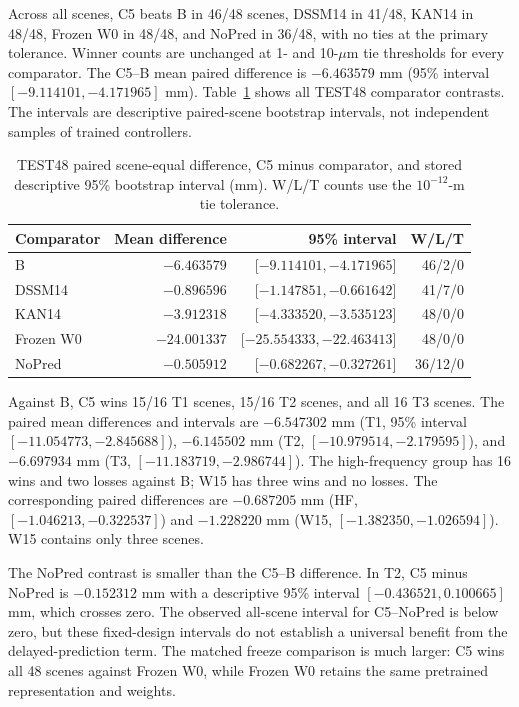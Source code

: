 \documentclass[11pt]{article}
\begin{document}
Across all scenes, C5 beats B in 46/48 scenes, DSSM14 in 41/48, KAN14 in 48/48, Frozen W0 in 48/48, and NoPred in 36/48, with no ties at the primary tolerance. Winner counts are unchanged at 1- and 10-$\mu$m tie thresholds for every comparator. The C5--B mean paired difference is $-6.463579$ mm (95\% interval $[-9.114101,-4.171965]$ mm). Table~\ref{tab:contrasts} shows all TEST48 comparator contrasts. The intervals are descriptive paired-scene bootstrap intervals, not independent samples of trained controllers.

\begin{table}[t]
\centering
\small
\caption{TEST48 paired scene-equal difference, C5 minus comparator, and stored descriptive 95\% bootstrap interval (mm). W/L/T counts use the $10^{-12}$-m tie tolerance.}
\label{tab:contrasts}
\begin{tabular}{lrrr}
\toprule
Comparator & Mean difference & 95\% interval & W/L/T \\
\midrule
B & $-6.463579$ & [$-9.114101,-4.171965$] & 46/2/0 \\
DSSM14 & $-0.896596$ & [$-1.147851,-0.661642$] & 41/7/0 \\
KAN14 & $-3.912318$ & [$-4.333520,-3.535123$] & 48/0/0 \\
Frozen W0 & $-24.001337$ & [$-25.554333,-22.463413$] & 48/0/0 \\
NoPred & $-0.505912$ & [$-0.682267,-0.327261$] & 36/12/0 \\
\bottomrule
\end{tabular}
\end{table}

Against B, C5 wins 15/16 T1 scenes, 15/16 T2 scenes, and all 16 T3 scenes. The paired mean differences and intervals are $-6.547302$ mm (T1, 95\% interval $[-11.054773,-2.845688]$), $-6.145502$ mm (T2, $[-10.979514,-2.179595]$), and $-6.697934$ mm (T3, $[-11.183719,-2.986744]$). The high-frequency group has 16 wins and two losses against B; W15 has three wins and no losses. The corresponding paired differences are $-0.687205$ mm (HF, $[-1.046213,-0.322537]$) and $-1.228220$ mm (W15, $[-1.382350,-1.026594]$). W15 contains only three scenes.

The NoPred contrast is smaller than the C5--B difference. In T2, C5 minus NoPred is $-0.152312$ mm with a descriptive 95\% interval $[-0.436521,0.100665]$ mm, which crosses zero. The observed all-scene interval for C5--NoPred is below zero, but these fixed-design intervals do not establish a universal benefit from the delayed-prediction term. The matched freeze comparison is much larger: C5 wins all 48 scenes against Frozen W0, while Frozen W0 retains the same pretrained representation and weights.
\end{document}
